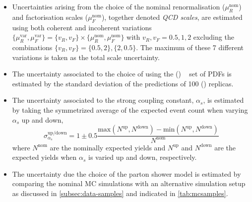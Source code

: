 \begin{itemize}
    \item Uncertainties arising from the choice of the nominal renormalisation ($\mu_R^\text{nom}$) and factorisation scales ($\mu_F^\text{nom}$), together denoted \emph{QCD scales}, are estimated using both coherent and incoherent variations $\{\mu^{\text{var}}_R , \mu^{\text{var}}_F \} = \{v_R, v_F \} \times \{\mu^{\text{nom}}_R , \mu^{\text{nom}}_F \}$ with $v_R, v_F = 0.5, 1, 2$ excluding the combinations $\{v_R, v_F \} = \{0.5, 2\}, \{2, 0.5\}$. 
    The maximum of these 7 different variations is taken as the total scale uncertainty.
    \item The uncertainty associated to the choice of using the \nnpdfnnlo (\nnpdfnlo) ~\cite{Ball:2014uwa} set of PDFs is estimated by the standard deviation of the predictions of 100 \nnpdfnnlo (\nnpdfnlo) replicas.
    \item The uncertainty associated to the strong coupling constant, $\alpha_s$, is estimated by taking the symmetrized average of the expected event count when varying $\alpha_s$ up and down, 
     \begin{equation}
        \sigma_{\alpha_s}^\text{up/down} = 1 \pm 0.5 \frac{ \text{max}(N^\text{up},N^\text{down}) - \text{min}(N^\text{up},N^\text{down})}{N^\text{nom}}
    \end{equation}
    where $N^\text{nom}$ are the nominally expected yields and $N^\text{up}$ and $N^\text{down}$ are the expected yields when $\alpha_s$ is varied up and down, respectively.
    \item The uncertainty due the choice of the parton shower model is estimated by comparing the nominal MC simulations with an alternative simulation setup as discussed in \cref{subsec:data-samples} and indicated in \cref{tab:mcsamples}. 
\end{itemize}

